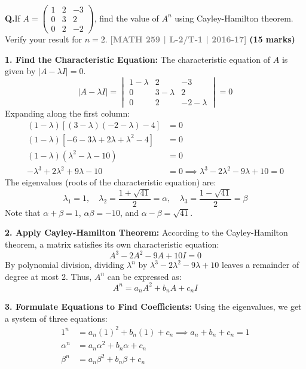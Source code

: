 \documentclass[12pt,a3paper]{article}
\newcommand{\yr}[1]{\hfill\textcolor{gray}{\small\textbf{[#1]}}}
\newcommand{\mk}[1]{\textcolor{orange!70!black}{\small\textbf{(#1 marks)}}}
\newcounter{qnum}
\newcommand{\Q}[1]{%
  \needspace{4\baselineskip}
  \refstepcounter{qnum}
  \vspace{6pt}
  \noindent\textbf{Q\theqnum.}\enspace #1\par
}
\begin{document}
\Q{If $A = \begin{pmatrix} 1 & 2 & -3 \\ 0 & 3 & 2 \\ 0 & 2 & -2 \end{pmatrix}$, find the value of $A^n$ using Cayley-Hamilton theorem. Verify your result for $n = 2$.
\yr{MATH 259 | L-2/T-1 | 2016-17} \mk{15}}

\begin{tcolorbox}[enhanced,breakable,
  colback=cE!4,colframe=cE,boxrule=0.8pt,arc=5pt,
  title={\textbf{Answer --- Finding $A^n$ via Cayley-Hamilton Theorem}},
  fonttitle=\bfseries\color{white},colbacktitle=cE]

\textbf{1. Find the Characteristic Equation:}
The characteristic equation of $A$ is given by $|A - \lambda I| = 0$.
\[
|A - \lambda I| = \begin{vmatrix} 
1-\lambda & 2 & -3 \\ 
0 & 3-\lambda & 2 \\ 
0 & 2 & -2-\lambda 
\end{vmatrix} = 0
\]
Expanding along the first column:
\begin{align*}
(1-\lambda) [ (3-\lambda)(-2-\lambda) - 4 ] &= 0 \\
(1-\lambda) [ -6 - 3\lambda + 2\lambda + \lambda^2 - 4 ] &= 0 \\
(1-\lambda) ( \lambda^2 - \lambda - 10 ) &= 0 \\
-\lambda^3 + 2\lambda^2 + 9\lambda - 10 &= 0 \implies \lambda^3 - 2\lambda^2 - 9\lambda + 10 = 0
\end{align*}
The eigenvalues (roots of the characteristic equation) are:
\[
\lambda_1 = 1, \quad \lambda_2 = \frac{1+\sqrt{41}}{2} = \alpha, \quad \lambda_3 = \frac{1-\sqrt{41}}{2} = \beta
\]
Note that $\alpha + \beta = 1$, $\alpha\beta = -10$, and $\alpha - \beta = \sqrt{41}$.

\vspace{0.3cm}
\textbf{2. Apply Cayley-Hamilton Theorem:}
According to the Cayley-Hamilton theorem, a matrix satisfies its own characteristic equation:
\[
A^3 - 2A^2 - 9A + 10I = 0
\]
By polynomial division, dividing $\lambda^n$ by $\lambda^3 - 2\lambda^2 - 9\lambda + 10$ leaves a remainder of degree at most 2. Thus, $A^n$ can be expressed as:
\[
A^n = a_n A^2 + b_n A + c_n I
\]

\textbf{3. Formulate Equations to Find Coefficients:}
Using the eigenvalues, we get a system of three equations:
\begin{align}
1^n &= a_n(1)^2 + b_n(1) + c_n \implies a_n + b_n + c_n = 1 \\
\alpha^n &= a_n\alpha^2 + b_n\alpha + c_n \\
\beta^n &= a_n\beta^2 + b_n\beta + c_n
\end{align}


\end{tcolorbox}
\end{document}
